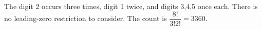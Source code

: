 The digit 2 occurs three times, digit 1 twice, and digits 3,4,5 once each. There is no leading-zero restriction to consider. The count is $\dfrac{8!}{3!2!}=\boxed{3360}$.
